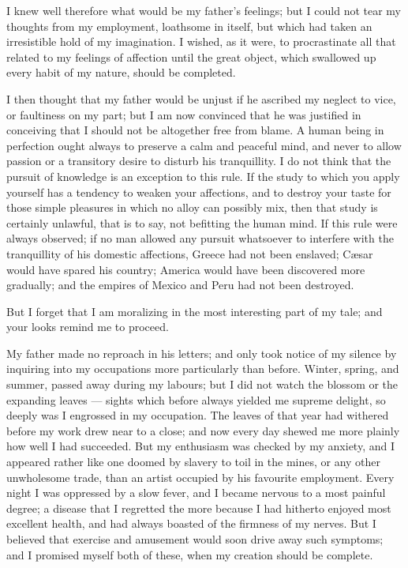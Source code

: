 I knew well therefore what would be
my father's feelings; but I could not
tear my thoughts from my employment,
loathsome in itself, but which had
taken an irresistible hold of my imagination.
I wished, as it were, to procrastinate
all that related to my feelings
of affection until the great object,
which swallowed up every habit of my
nature, should be completed.

I then thought that my father would
be unjust if he ascribed my neglect to
vice, or faultiness on my part; but I
am now convinced that he was justified
in conceiving that I should not
be altogether free from blame. A human
being in perfection ought always
to preserve a calm and peaceful mind,
and never to allow passion or a transitory
desire to disturb his tranquillity.
I do not think that the pursuit of knowledge
is an exception to this rule. If
the study to which you apply yourself
has a tendency to weaken your affections,
and to destroy your taste for those
simple pleasures in which no alloy can
possibly mix, then that study is certainly
unlawful, that is to say, not befitting
the human mind. If this rule
were always observed; if no man
allowed any pursuit whatsoever to interfere
with the tranquillity of his domestic
affections, Greece had not been enslaved;
Cæsar would have spared his
country; America would have been
discovered more gradually; and the
empires of Mexico and Peru had not
been destroyed.

But I forget that I am moralizing in
the most interesting part of my tale;
and your looks remind me to proceed.

My father made no reproach in his
letters; and only took notice of my
silence by inquiring into my occupations
more particularly than before.
Winter, spring, and summer, passed
away during my labours; but I did not
watch the blossom or the expanding
leaves --- sights which before always
yielded me supreme delight, so deeply
was I engrossed in my occupation. The
leaves of that year had withered before
my work drew near to a close; and
now every day shewed me more plainly
how well I had succeeded. But my
enthusiasm was checked by my anxiety,
and I appeared rather like one doomed
by slavery to toil in the mines, or any
other unwholesome trade, than an artist
occupied by his favourite employment.
Every night I was oppressed by a slow
fever, and I became nervous to a most
painful degree; a disease that I regretted
the more because I had hitherto enjoyed
most excellent health, and had
always boasted of the firmness of my
nerves. But I believed that exercise
and amusement would soon drive away
such symptoms; and I promised myself
both of these, when my creation should
be complete.

